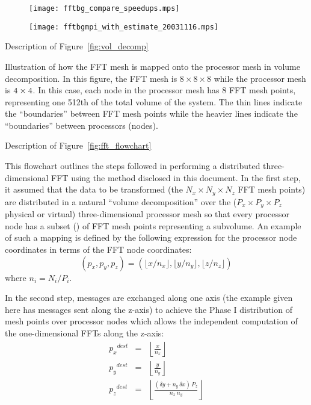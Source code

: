 \documentclass[pdftex,finalversion,simpleeqnnos,titlepage,12pt]{article}
\newcommand{\nodecount}{\ensuremath{P}}
\newcommand{\meshsize}[1]{\ensuremath{N_{#1}}}
\newcommand{\nodemeshsize}[1]{\ensuremath{\nodecount_{#1}}}
\newcommand{\nodecoord}[1]{\ensuremath{p_{#1}}}
\newcommand{\meshpernode}[1]{\ensuremath{n_{#1}}}
\begin{document}
\begin{sidewaysfigure}[p]
\texttt{[image: fftbg\_compare\_speedups.mps]}
\caption{}
\label{fig:fft3d_speedups}
\end{sidewaysfigure}

\begin{sidewaysfigure}[p]
\texttt{[image: fftbgmpi\_with\_estimate\_20031116.mps]}
  \caption{}
\label{fig:fft3d_meas}
\end{sidewaysfigure}

\newpage  %

Description of Figure~\ref{fig:vol_decomp}

Illustration of how the FFT mesh is mapped onto the processor mesh in
volume decomposition.  In this figure, the FFT mesh is $8\times
8\times 8$ while the processor mesh is $4\time 4\times 4$.  In this
case, each node in the processor mesh has 8 FFT mesh points,
representing one 512th of the total volume of the system. The thin
lines indicate the ``boundaries'' between FFT mesh points while the
heavier lines indicate the ``boundaries'' between processors (nodes).

\newpage  %

Description of Figure~\ref{fig:fft_flowchart}

This flowchart outlines the steps followed in performing a distributed
three-dimensional FFT using the method disclosed in this document. In
the first step, it assumed that the data to be transformed (the
$\meshsize{x}\times\meshsize{y}\times\meshsize{z}$ FFT mesh points)  are
distributed in a natural ``volume decomposition'' over the
($\nodemeshsize{x}\times\nodemeshsize{y}\times\nodemeshsize{z}$ physical
or virtual) three-dimensional processor mesh so that every processor
node has a subset () of FFT mesh points representing a subvolume.  An
example of such a mapping is defined by the following expression for
the processor node coordinates in terms of the FFT
node coordinates:
\begin{displaymath}
(\nodecoord{x}, \nodecoord{y}, \nodecoord{z}) = (\lfloor
  x/\meshpernode{x} \rfloor, \lfloor y/\meshpernode{y} \rfloor, \lfloor
  z/\meshpernode{z} \rfloor)
\end{displaymath}
where $\meshpernode{i} = \meshsize{i}/\nodemeshsize{i}$.

In the second step, messages are exchanged along one axis (the example
given here has messages sent along the z-axis) to achieve the Phase I
distribution of mesh points over processor nodes which allows the
independent computation of the one-dimensional FFTs along the z-axis:
\begin{eqnarray*}
\nodecoord{x}^{dest} & = & \left\lfloor \frac{x}{\meshpernode{x}} \right\rfloor \\
\nodecoord{y}^{dest} & = & \left\lfloor \frac{y}{\meshpernode{y}} \right\rfloor \\
\nodecoord{z}^{dest} & = & \left\lfloor \frac{ ( \delta y +
  \meshpernode{y}\,\delta x  ) \,\nodemeshsize{z} }{\meshpernode{x}\,\meshpernode{y}}\right\rfloor
\end{eqnarray*}
\end{document}
